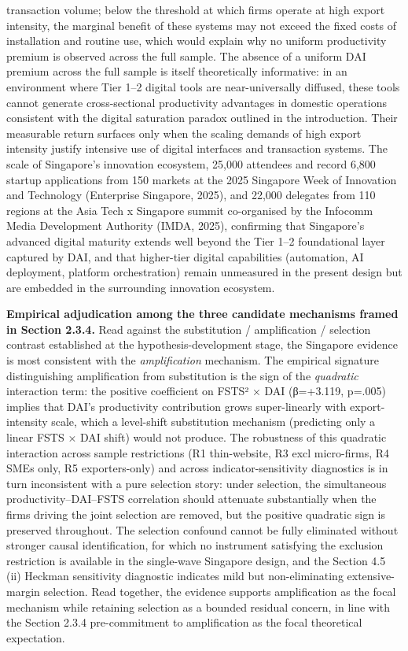 \documentclass[
  12pt,a4paper]{article}
\begin{document}
transaction volume; below the threshold at which firms operate at high
export intensity, the marginal benefit of these systems may not exceed
the fixed costs of installation and routine use, which would explain why
no uniform productivity premium is observed across the full sample. The
absence of a uniform DAI premium across the full sample is itself
theoretically informative: in an environment where Tier 1--2 digital
tools are near-universally diffused, these tools cannot generate
cross-sectional productivity advantages in domestic operations
consistent with the digital saturation paradox outlined in the
introduction. Their measurable return surfaces only when the scaling
demands of high export intensity justify intensive use of digital
interfaces and transaction systems. The scale of Singapore's innovation
ecosystem, 25,000 attendees and record 6,800 startup applications from
150 markets at the 2025 Singapore Week of Innovation and Technology
(Enterprise Singapore, 2025), and 22,000 delegates from 110 regions at
the Asia Tech x Singapore summit co-organised by the Infocomm Media
Development Authority (IMDA, 2025), confirming that Singapore's advanced
digital maturity extends well beyond the Tier 1--2 foundational layer
captured by DAI, and that higher-tier digital capabilities (automation,
AI deployment, platform orchestration) remain unmeasured in the present
design but are embedded in the surrounding innovation ecosystem.

\textbf{Empirical adjudication among the three candidate mechanisms
framed in Section 2.3.4.} Read against the substitution / amplification
/ selection contrast established at the hypothesis-development stage,
the Singapore evidence is most consistent with the \emph{amplification}
mechanism. The empirical signature distinguishing amplification from
substitution is the sign of the \emph{quadratic} interaction term: the
positive coefficient on FSTS² × DAI (β=+3.119, p=.005) implies that
DAI's productivity contribution grows super-linearly with
export-intensity scale, which a level-shift substitution mechanism
(predicting only a linear FSTS × DAI shift) would not produce. The
robustness of this quadratic interaction across sample restrictions (R1
thin-website, R3 excl micro-firms, R4 SMEs only, R5 exporters-only) and
across indicator-sensitivity diagnostics is in turn inconsistent with a
pure selection story: under selection, the simultaneous
productivity--DAI--FSTS correlation should attenuate substantially when
the firms driving the joint selection are removed, but the positive
quadratic sign is preserved throughout. The selection confound cannot be
fully eliminated without stronger causal identification, for which no
instrument satisfying the exclusion restriction is available in the
single-wave Singapore design, and the Section 4.5 (ii) Heckman
sensitivity diagnostic indicates mild but non-eliminating
extensive-margin selection. Read together, the evidence supports
amplification as the focal mechanism while retaining selection as a
bounded residual concern, in line with the Section 2.3.4 pre-commitment
to amplification as the focal theoretical expectation.
\end{document}
